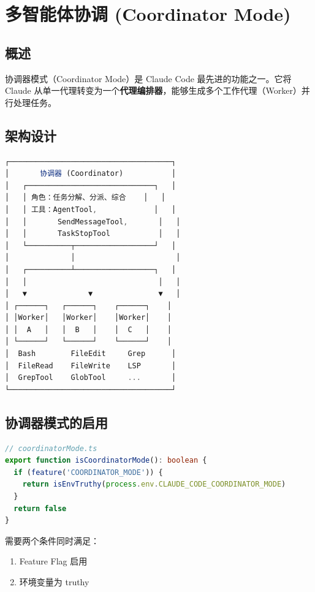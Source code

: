 \chapter{多智能体协调 (Coordinator Mode)}

\section{概述}

协调器模式（Coordinator Mode）是 Claude Code 最先进的功能之一。它将 Claude 从单一代理转变为一个\textbf{代理编排器}，能够生成多个工作代理（Worker）并行处理任务。

\section{架构设计}

\begin{lstlisting}[language=TypeScript,breaklines=true]
┌─────────────────────────────────────┐
│       协调器 (Coordinator)           │
│   ┌─────────────────────────────┐   │
│   │ 角色：任务分解、分派、综合    │   │
│   │ 工具：AgentTool,             │   │
│   │       SendMessageTool,       │   │
│   │       TaskStopTool           │   │
│   └──────────┬──────────────────┘   │
│              │                       │
│   ┌──────────┴──────────────────┐   │
│   │                              │   │
│   ▼              ▼               ▼   │
│ ┌──────┐   ┌──────┐    ┌──────┐    │
│ │Worker│   │Worker│    │Worker│    │
│ │  A   │   │  B   │    │  C   │    │
│ └──────┘   └──────┘    └──────┘    │
│  Bash        FileEdit     Grep      │
│  FileRead    FileWrite    LSP       │
│  GrepTool    GlobTool     ...       │
└─────────────────────────────────────┘
\end{lstlisting}

\section{协调器模式的启用}

\begin{lstlisting}[language=TypeScript,breaklines=true]
// coordinatorMode.ts
export function isCoordinatorMode(): boolean {
  if (feature('COORDINATOR_MODE')) {
    return isEnvTruthy(process.env.CLAUDE_CODE_COORDINATOR_MODE)
  }
  return false
}
\end{lstlisting}

需要两个条件同时满足：
\begin{enumerate}[nosep]
  \item {} Feature Flag 启用
  \item {} 环境变量为 truthy
\end{enumerate}

